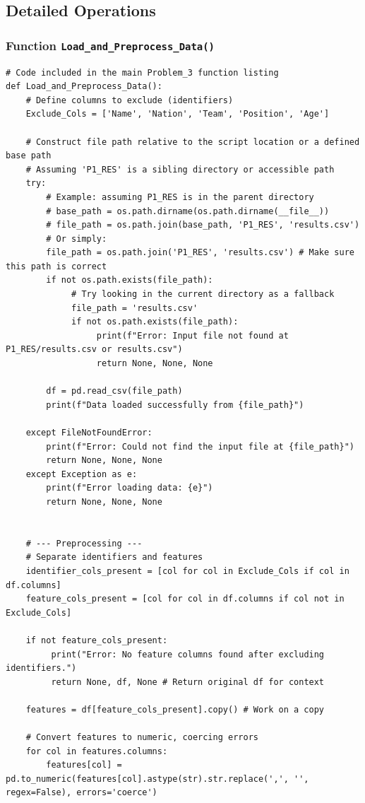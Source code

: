 \documentclass[12pt]{report}
\begin{document}
{{{\subsection{Detailed Operations} %
\subsubsection{Function \texttt{Load\_and\_Preprocess\_Data()}} %
\begin{lstlisting}
# Code included in the main Problem_3 function listing
def Load_and_Preprocess_Data():
    # Define columns to exclude (identifiers)
    Exclude_Cols = ['Name', 'Nation', 'Team', 'Position', 'Age']

    # Construct file path relative to the script location or a defined base path
    # Assuming 'P1_RES' is a sibling directory or accessible path
    try:
        # Example: assuming P1_RES is in the parent directory
        # base_path = os.path.dirname(os.path.dirname(__file__))
        # file_path = os.path.join(base_path, 'P1_RES', 'results.csv')
        # Or simply:
        file_path = os.path.join('P1_RES', 'results.csv') # Make sure this path is correct
        if not os.path.exists(file_path):
             # Try looking in the current directory as a fallback
             file_path = 'results.csv'
             if not os.path.exists(file_path):
                  print(f"Error: Input file not found at P1_RES/results.csv or results.csv")
                  return None, None, None

        df = pd.read_csv(file_path)
        print(f"Data loaded successfully from {file_path}")

    except FileNotFoundError:
        print(f"Error: Could not find the input file at {file_path}")
        return None, None, None
    except Exception as e:
        print(f"Error loading data: {e}")
        return None, None, None


    # --- Preprocessing ---
    # Separate identifiers and features
    identifier_cols_present = [col for col in Exclude_Cols if col in df.columns]
    feature_cols_present = [col for col in df.columns if col not in Exclude_Cols]

    if not feature_cols_present:
         print("Error: No feature columns found after excluding identifiers.")
         return None, df, None # Return original df for context

    features = df[feature_cols_present].copy() # Work on a copy

    # Convert features to numeric, coercing errors
    for col in features.columns:
        features[col] = pd.to_numeric(features[col].astype(str).str.replace(',', '', regex=False), errors='coerce')



\end{lstlisting}}}}
\end{document}
